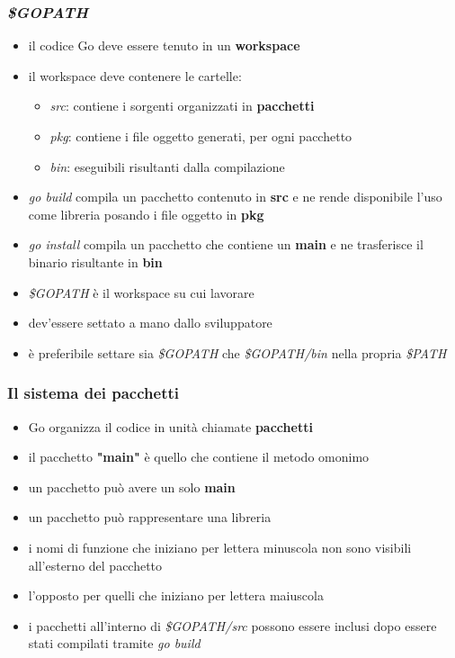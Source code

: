\documentclass[12pt]{beamer}
\begin{document}
	\begin{frame}
		\frametitle{\textit{\$GOPATH}}
		\begin{itemize}[<+->]
			\item il codice Go deve essere tenuto in un \textbf{workspace}
			\item il workspace deve contenere le cartelle:
			\begin{itemize}
				\item \textit{src}: contiene i sorgenti organizzati in \textbf{pacchetti}
				\item \textit{pkg}: contiene i file oggetto generati, per ogni pacchetto
				\item \textit{bin}: eseguibili risultanti dalla compilazione
			\end{itemize}
			
			\item \textit{go build} compila un pacchetto contenuto in \textbf{src} e ne rende disponibile l'uso come libreria posando i file oggetto in \textbf{pkg}
			\item \textit{go install} compila un pacchetto che contiene un \textbf{main} e ne trasferisce il binario risultante in \textbf{bin}
			\item \textit{\$GOPATH} è il workspace su cui lavorare
			\item dev'essere settato a mano dallo sviluppatore
			\item è preferibile settare sia \textit{\$GOPATH} che \textit{\$GOPATH/bin} nella propria \textit{\$PATH}
		\end{itemize}
	\end{frame}
	
	\begin{frame}
		\frametitle{Il sistema dei pacchetti}
			\begin{itemize}[<+->]
				\item Go organizza il codice in unità chiamate \textbf{pacchetti}
				\item il pacchetto \textbf{"main"} è quello che contiene il metodo omonimo
				\item un pacchetto può avere un solo \textbf{main}
				\item un pacchetto può rappresentare una libreria
				\item i nomi di funzione che iniziano per lettera minuscola non sono visibili all'esterno del pacchetto
				\item l'opposto per quelli che iniziano per lettera maiuscola
				\item i pacchetti all'interno di \textit{\$GOPATH/src} possono essere inclusi dopo essere stati compilati tramite \textit{go build}
			\end{itemize}
	\end{frame}
	
\end{document}
